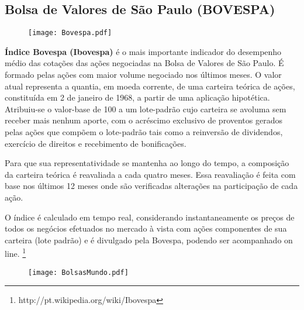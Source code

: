 \documentclass[../../relatorio.tex]{subfiles}
\begin{document}
\subsection{Bolsa de Valores de São Paulo (BOVESPA)}

\begin{figure}[!ht]
  \begin{minipage}{0.70\textheight}
    \centering
      \texttt{[image: Bovespa.pdf]}
  \end{minipage}
\end{figure}

\textbf{Índice Bovespa (Ibovespa)} é o mais importante indicador do desempenho médio das cotações das ações negociadas na Bolsa de Valores de São Paulo. É formado pelas ações com maior volume negociado nos últimos meses. O valor atual representa a quantia, em moeda corrente, de uma carteira teórica de ações, constituída em 2 de janeiro de 1968, a partir de uma aplicação hipotética. Atribuiu-se o valor-base de 100 a um lote-padrão cujo carteira se avoluma sem receber mais nenhum aporte, com o acréscimo exclusivo de proventos gerados pelas ações que compõem o lote-padrão tais como a reinversão de dividendos, exercício de direitos e recebimento de bonificações.

Para que sua representatividade se mantenha ao longo do tempo, a composição da carteira teórica é reavaliada a cada quatro meses. Essa reavaliação é feita com base nos últimos 12 meses onde são verificadas alterações na participação de cada ação.

O índice é calculado em tempo real, considerando instantaneamente os preços de todos os negócios efetuados no mercado à vista com ações componentes de sua carteira (lote padrão) e é divulgado pela Bovespa, podendo ser acompanhado on line. \footnote{http://pt.wikipedia.org/wiki/Ibovespa}

\pagebreak


\begin{figure}[!ht]
  \begin{minipage}{\textwidth}
    \centering
      \texttt{[image: BolsasMundo.pdf]}
  \end{minipage}
\end{figure}

\pagebreak
\end{document}
